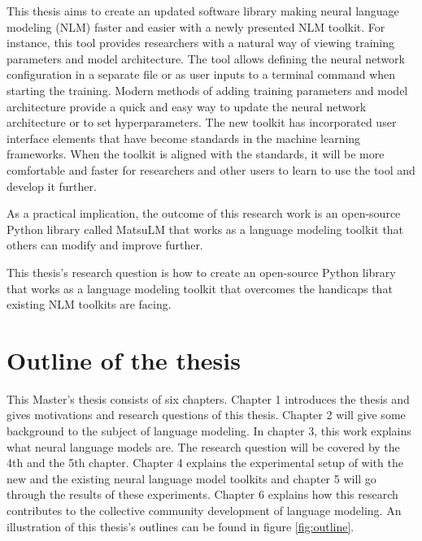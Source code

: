 This thesis aims to create an updated software library making neural language modeling (NLM) faster and easier with a newly presented NLM toolkit. For instance, this tool provides researchers with a natural way of viewing training parameters and model architecture. The tool allows defining the neural network configuration in a separate file or as user inputs to a terminal command when starting the training. Modern methods of adding training parameters and model architecture provide a quick and easy way to update the neural network architecture or to set hyperparameters. The new toolkit has incorporated user interface elements that have become standards in the machine learning frameworks. When the toolkit is aligned with the standards, it will be more comfortable and faster for researchers and other users to learn to use the tool and develop it further.

As a practical implication, the outcome of this research work is an open-source Python library called MatsuLM that works as a language modeling toolkit that others can modify and improve further.

This thesis's research question is how to create an open-source Python library that works as a language modeling toolkit that overcomes the handicaps that existing NLM toolkits are facing. 

\section{Outline of the thesis}

This Master's thesis consists of six chapters. Chapter 1 introduces the thesis and gives motivations and research questions of this thesis. Chapter 2 will give some background to the subject of language modeling. In chapter 3, this work explains what neural language models are. The research question will be covered by the 4th and the 5th chapter. Chapter 4 explains the experimental setup of with the new and the existing neural language model toolkits and chapter 5 will go through the results of these experiments. Chapter 6 explains how this research contributes to the collective community development of language modeling. An illustration of this thesis's outlines can be found in figure \ref{fig:outline}.

